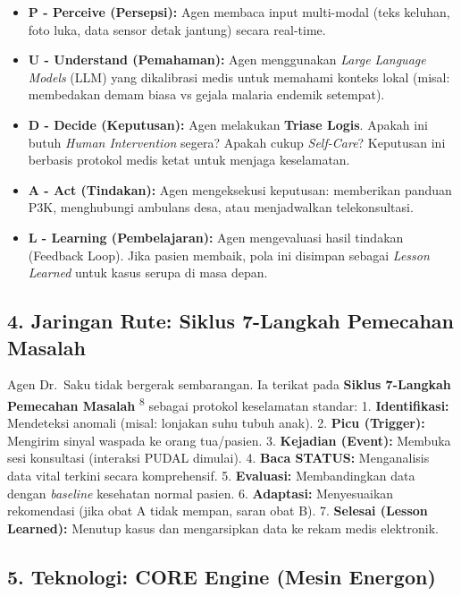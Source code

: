 \documentclass[
  letterpaper,
  DIV=11,
  numbers=noendperiod]{scrreprt}
\providecommand{\tightlist}{%
  \setlength{\itemsep}{0pt}\setlength{\parskip}{0pt}}
\begin{document}
\begin{itemize}
\tightlist
\item
  \textbf{P - Perceive (Persepsi):} Agen membaca input multi-modal (teks
  keluhan, foto luka, data sensor detak jantung) secara real-time.
\item
  \textbf{U - Understand (Pemahaman):} Agen menggunakan \emph{Large
  Language Models} (LLM) yang dikalibrasi medis untuk memahami konteks
  lokal (misal: membedakan demam biasa vs gejala malaria endemik
  setempat).
\item
  \textbf{D - Decide (Keputusan):} Agen melakukan \textbf{Triase Logis}.
  Apakah ini butuh \emph{Human Intervention} segera? Apakah cukup
  \emph{Self-Care}? Keputusan ini berbasis protokol medis ketat untuk
  menjaga keselamatan.
\item
  \textbf{A - Act (Tindakan):} Agen mengeksekusi keputusan: memberikan
  panduan P3K, menghubungi ambulans desa, atau menjadwalkan
  telekonsultasi.
\item
  \textbf{L - Learning (Pembelajaran):} Agen mengevaluasi hasil tindakan
  (Feedback Loop). Jika pasien membaik, pola ini disimpan sebagai
  \emph{Lesson Learned} untuk kasus serupa di masa depan.
\end{itemize}

\subsection{4. Jaringan Rute: Siklus 7-Langkah Pemecahan
Masalah}\label{jaringan-rute-siklus-7-langkah-pemecahan-masalah}

Agen Dr.~Saku tidak bergerak sembarangan. Ia terikat pada \textbf{Siklus
7-Langkah Pemecahan Masalah} \textsuperscript{8} sebagai protokol
keselamatan standar: 1. \textbf{Identifikasi:} Mendeteksi anomali
(misal: lonjakan suhu tubuh anak). 2. \textbf{Picu (Trigger):} Mengirim
sinyal waspada ke orang tua/pasien. 3. \textbf{Kejadian (Event):}
Membuka sesi konsultasi (interaksi PUDAL dimulai). 4. \textbf{Baca
STATUS:} Menganalisis data vital terkini secara komprehensif. 5.
\textbf{Evaluasi:} Membandingkan data dengan \emph{baseline} kesehatan
normal pasien. 6. \textbf{Adaptasi:} Menyesuaikan rekomendasi (jika obat
A tidak mempan, saran obat B). 7. \textbf{Selesai (Lesson Learned):}
Menutup kasus dan mengarsipkan data ke rekam medis elektronik.

\subsection{5. Teknologi: CORE Engine (Mesin
Energon)}\label{teknologi-core-engine-mesin-energon}
\end{document}

